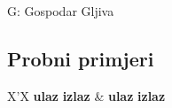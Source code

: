 \begin{statement}[
  timelimit=1 s,
  memorylimit=512 MiB,
]{G: Gospodar Gljiva}
\subsection*{Probni primjeri}
\begin{tabularx}{\textwidth}{X'X}
  \textbf{ulaz}
  \linespread{1}{}
  \textbf{izlaz}
  \linespread{1}{} &
  \textbf{ulaz}
  \linespread{1}{}
  \textbf{izlaz}
  \linespread{1}{}
\end{tabularx}

\end{statement}

